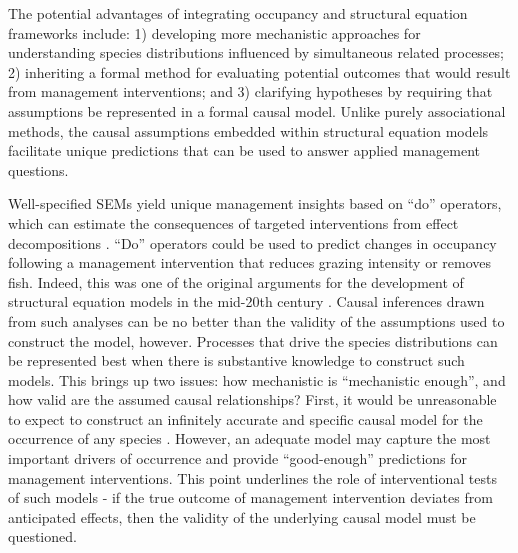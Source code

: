 The potential advantages of integrating occupancy and structural
equation frameworks include: 1) developing more mechanistic approaches
for understanding species distributions influenced by simultaneous
related processes; 2) inheriting a formal method for evaluating
potential outcomes that would result from management interventions; and
3) clarifying hypotheses by requiring that assumptions be represented in
a formal causal model. Unlike purely associational methods, the causal
assumptions embedded within structural equation models facilitate unique
predictions that can be used to answer applied management questions.

Well-specified SEMs yield unique management insights based on ``do''
operators, which can estimate the consequences of targeted interventions
from effect decompositions \citep{PEARL1998}. ``Do'' operators could be used
to predict changes in occupancy following a management intervention that
reduces grazing intensity or removes fish. Indeed, this was one of the
original arguments for the development of structural equation models in
the mid-20th century \citep{Marschak, Koopmans}. Causal inferences
drawn from such analyses can be no better than the validity of the
assumptions used to construct the model, however. Processes that drive
the species distributions can be represented best when there is
substantive knowledge to construct such models. This brings up two
issues: how mechanistic is ``mechanistic enough'', and how valid are the
assumed causal relationships? First, it would be unreasonable to expect
to construct an infinitely accurate and specific causal model for the
occurrence of any species \citep{shipley2002cause}. However, an adequate model may
capture the most important drivers of occurrence and provide
``good-enough'' predictions for management interventions. This point
underlines the role of interventional tests of such models - if the true
outcome of management intervention deviates from anticipated effects,
then the validity of the underlying causal model must be questioned.

